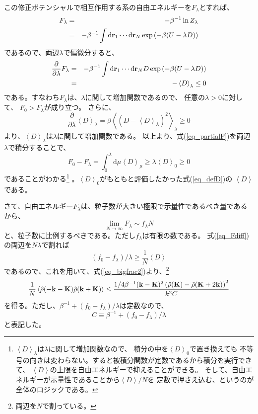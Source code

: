 \documentclass{jarticle}
\renewcommand{\v}[1]{{\bf #1}}
\newcommand{\ave}[1]{\left< #1 \right>}
\newcommand{\hr}{\hat{\rho}}
\begin{document}
この修正ポテンシャルで相互作用する系の自由エネルギーを$F_\lambda$とすれば、
\begin{eqnarray}
  F_\lambda &=& - \beta^{-1} \ln Z_\lambda \\
  &=& - \beta^{-1} \int \mbox{d} \v{r}_1 \cdots \mbox{d}\v{r}_N \exp{(-\beta (U-\lambda D))}
\end{eqnarray}
であるので、両辺$\lambda$で偏微分すると、
\begin{eqnarray}
  \frac{\partial}{\partial \lambda} F_\lambda &=& - \beta^{-1} \int \mbox{d} \v{r}_1 \cdots \mbox{d}\v{r}_N D \exp{(-\beta (U-\lambda D))} \\ \nonumber
  &=& - \ave{D}_\lambda \le 0 \label{eq_partialF}
\end{eqnarray}
である。すなわち$F_\lambda$は、$\lambda$に関して増加関数であるので、
任意の$\lambda > 0$に対して、
$F_0 > F_\lambda$が成り立つ。
さらに、
\begin{equation}
  \frac{\partial}{\partial \lambda} \ave{D}_\lambda
  = \beta \ave{\left(D-\ave{D}_\lambda\right)^2 }_\lambda \ge 0
\end{equation}
より、$\ave{D}_\lambda$は$\lambda$に関して増加関数である。
以上より、式(\ref{eq_partialF})を両辺$\lambda$で積分することで、
\begin{equation}
  F_0 - F_\lambda = \int_0^{\lambda} \mbox{d}\mu \ave{D}_\mu \ge \lambda \ave{D}_0 \ge 0
  \label{eq_Fdiff}
\end{equation}
であることがわかる\footnote{
  $\ave{D}_\lambda$は$\lambda$に関して増加関数なので、
  積分の中を$\ave{D}_0$で置き換えても
  不等号の向きは変わらない。すると被積分関数が定数であるから積分を実行できて、
  $\ave{D}$の上限を自由エネルギーで抑えることができる。
  そして、自由エネルギーが示量性であることから$\ave{D}/N$を
  定数で押さえ込む、というのが全体のロジックである。}
。$\ave{D}_0$がもともと評価したかった式(\ref{eq_defD})の
$\ave{D}$である。

さて、自由エネルギー$F_\lambda$は、粒子数が大きい極限で示量性であるべき量であるから、
\begin{equation}
  \lim_{N \rightarrow \infty} F_\lambda \sim f_\lambda N
\end{equation}
と、粒子数に比例するべきである。ただし$f_\lambda$は有限の数である。
式(\ref{eq_Fdiff})の両辺を$N\lambda$で割れば
\begin{equation}
  (f_0 - f_\lambda)/\lambda \ge \frac{1}{N}\ave{D}
\end{equation}
であるので、これを用いて、式(\ref{eq_bigfrac2})より、\footnote{
  両辺を$N$で割っている。
}
\begin{equation}
  \frac{1}{N}
  \ave{\hat{\rho}(-\v{k}-\v{K}) \hat{\rho}(\v{k}+\v{K})}
  \le
  \frac{
    1/4 \beta^{-1} (\v{k} - \v{K})^2
    \left( \hr(\v{K})-\hr(\v{K}+2\v{k}) \right)^2
  }{
    k^2  C
  }
  \label{eq_bigfrac3}
\end{equation}
を得る。ただし、$\beta^{-1} + (f_0 - f_\lambda)/\lambda$は定数なので、
\begin{equation}
  C \equiv \beta^{-1} + (f_0 - f_\lambda)/\lambda
\end{equation}
と表記した。
\end{document}
